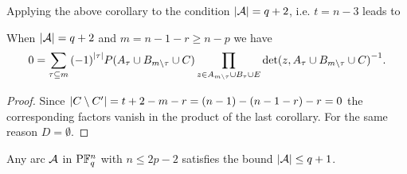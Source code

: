 Applying the above corollary to the condition $\left\vert{\mathcal{A}}\right\vert=q+2$, i.e. $t=n-3$ leads to

\begin{corollary}
    When $\left\vert{\mathcal{A}}\right\vert=q+2$ and $m=n-1-r\geq n-p$ we have
    $$
  0 = \sum_{\tau\subseteq m}{{(-1)}^{\left\vert{\tau}\right\vert}P(A_{\tau}\cup B_{m\setminus\tau}\cup C)}\prod_{\substack{z\in A_{m\setminus\tau}\cup B_{\tau}\cup E}}{{\det(z,A_{\tau}\cup B_{m\setminus\tau}\cup C)}^{-1}}.
    $$
\end{corollary}

\begin{proof}
    Since $\left\vert{C\setminus C'}\right\vert=t+2-m-r=(n-1)-(n-1-r)-r=0$ the corresponding factors vanish in the product of the last corollary. For the same reason $D=\emptyset$.
\end{proof}

\begin{corollary}
    Any arc $\mathcal{A}$ in $\P \field{q}^n$ with $n\leq 2p-2$ satisfies the bound $\left\vert{\mathcal{A}}\right\vert\leq q+1$.
\end{corollary}

